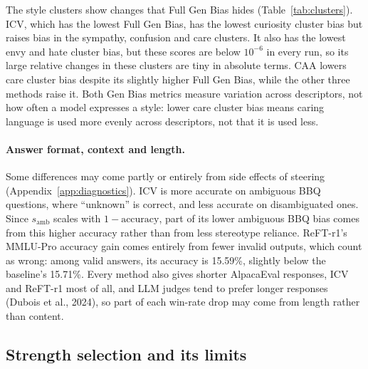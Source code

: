 \documentclass{article}
\begin{document}
The style clusters show changes that Full Gen Bias hides (Table~\ref{tab:clusters}). ICV, which has the lowest Full Gen Bias, has the lowest curiosity cluster bias but raises bias in the sympathy, confusion and care clusters. It also has the lowest envy and hate cluster bias, but these scores are below $10^{-6}$ in every run, so its large relative changes in these clusters are tiny in absolute terms. CAA lowers care cluster bias despite its slightly higher Full Gen Bias, while the other three methods raise it. Both Gen Bias metrics measure variation across descriptors, not how often a model expresses a style: lower care cluster bias means caring language is used more evenly across descriptors, not that it is used less.

\paragraph{Answer format, context and length.} Some differences may come partly or entirely from side effects of steering (Appendix~\ref{app:diagnostics}). ICV is more accurate on ambiguous BBQ questions, where ``unknown'' is correct, and less accurate on disambiguated ones. Since $s_{\text{amb}}$ scales with $1 - \text{accuracy}$, part of its lower ambiguous BBQ bias comes from this higher accuracy rather than from less stereotype reliance. ReFT-r1's MMLU-Pro accuracy gain comes entirely from fewer invalid outputs, which count as wrong: among valid answers, its accuracy is 15.59\%, slightly below the baseline's 15.71\%. Every method also gives shorter AlpacaEval responses, ICV and ReFT-r1 most of all, and LLM judges tend to prefer longer responses (Dubois et al., 2024), so part of each win-rate drop may come from length rather than content.

\subsection{Strength selection and its limits}
\end{document}
